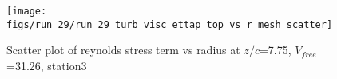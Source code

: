 \begin{figure}[H]
\centering
\texttt{[image: figs/run\_29/run\_29\_turb\_visc\_ettap\_top\_vs\_r\_mesh\_scatter]}
\caption{Scatter plot of reynolds stress term vs radius at $z/c$=7.75, $V_{free}$=31.26, station3}
\label{fig:run_29_turb_visc_ettap_top_vs_r_mesh_scatter}
\end{figure}



